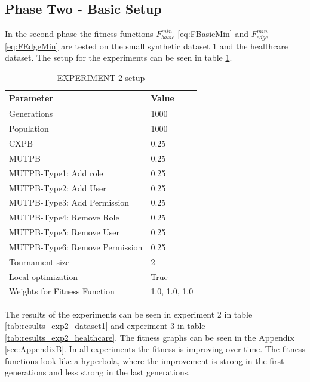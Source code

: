 \subsection{Phase Two - Basic Setup}
\label{sec:phase2}
In the second phase the fitness functions $F_{basic}^{min}$ \eqref{eq:FBasicMin} and $F_{edge}^{min}$ \eqref{eq:FEdgeMin} are tested on the small synthetic dataset 1 and the healthcare dataset. The setup for the experiments can be seen in table \ref{tab:setup2}.
\begin{table}[H]
    \centering
    \begin{tabular}{|l|l|}
        \hline
        \rowcolor{myGray} 
        \textbf{Parameter}              & \textbf{Value}    \\ \hline
        Generations                     & 1000              \\ \hline
        Population                      & 1000              \\ \hline
        CXPB                            & 0.25              \\ \hline
        MUTPB                           & 0.25              \\ \hline
        MUTPB-Type1: Add role           & 0.25              \\ \hline
        MUTPB-Type2: Add User           & 0.25              \\ \hline
        MUTPB-Type3: Add Permission     & 0.25              \\ \hline
        MUTPB-Type4: Remove Role        & 0.25              \\ \hline
        MUTPB-Type5: Remove User        & 0.25              \\ \hline
        MUTPB-Type6: Remove Permission  & 0.25              \\ \hline
        Tournament size                 & 2                 \\ \hline
        Local optimization              & True              \\ \hline
        Weights for Fitness Function    & 1.0, 1.0, 1.0     \\ \hline
    \end{tabular}
    \caption{EXPERIMENT 2 setup}
    \label{tab:setup2}
\end{table}
The results of the experiments can be seen in experiment 2 in table \ref{tab:results_exp2_dataset1} and experiment 3 in table \ref{tab:results_exp2_healthcare}. The fitness graphs can be seen in the Appendix \ref{sec:AppendixB}. In all experiments the fitness is improving over time. The fitness functions look like a hyperbola, where the improvement is strong in the first generations and less strong in the last generations.\\
